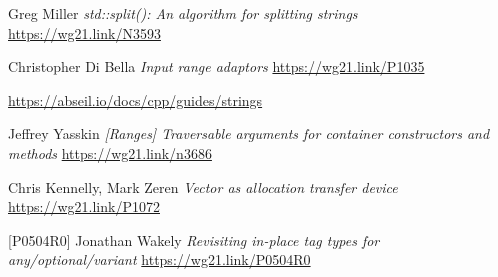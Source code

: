 \documentclass{wg21}
\begin{document}
\begin{thebibliography}{9}
    Greg Miller
    \emph{std::split(): An algorithm for splitting strings}\newline
    \url{https://wg21.link/N3593}

    Christopher Di Bella
    \emph{Input range adaptors}\newline
    \url{https://wg21.link/P1035}

    \url{https://abseil.io/docs/cpp/guides/strings}

    Jeffrey Yasskin
    \emph{[Ranges] Traversable arguments for container constructors and methods}\newline
    \url{https://wg21.link/n3686}

	Chris Kennelly, Mark Zeren
	\emph{Vector as allocation transfer device}
	\url{https://wg21.link/P1072}

[P0504R0]
	Jonathan Wakely
	\emph{Revisiting in-place tag types for any/optional/variant}
	\url{https://wg21.link/P0504R0}


\end{thebibliography}
\end{document}
